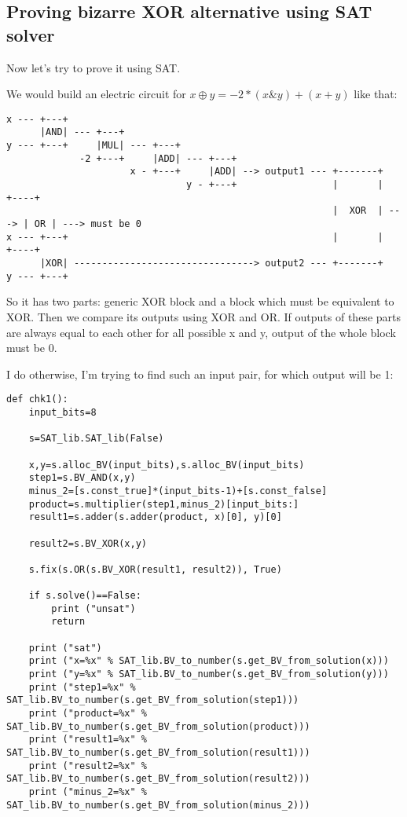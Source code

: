 \subsection{Proving bizarre XOR alternative using SAT solver}
\label{weird_XOR_SAT}

Now let's try to prove it using SAT.

We would build an electric circuit for $x \oplus y = -2*(x \& y) + (x + y)$ like that:

\begin{lstlisting}
x --- +---+
      |AND| --- +---+     
y --- +---+     |MUL| --- +---+
             -2 +---+     |ADD| --- +---+
                      x - +---+     |ADD| --> output1 --- +-------+
                                y - +---+                 |       |      +----+
                                                          |  XOR  | ---> | OR | ---> must be 0
x --- +---+                                               |       |      +----+
      |XOR| --------------------------------> output2 --- +-------+
y --- +---+
\end{lstlisting}

So it has two parts: generic XOR block and a block which must be equivalent to XOR.
Then we compare its outputs using XOR and OR.
If outputs of these parts are always equal to each other for all possible x and y, output of the whole block must be 0.

I do otherwise, I'm trying to find such an input pair, for which output will be 1:

\begin{lstlisting}
def chk1():
    input_bits=8

    s=SAT_lib.SAT_lib(False)

    x,y=s.alloc_BV(input_bits),s.alloc_BV(input_bits)
    step1=s.BV_AND(x,y)
    minus_2=[s.const_true]*(input_bits-1)+[s.const_false]
    product=s.multiplier(step1,minus_2)[input_bits:]
    result1=s.adder(s.adder(product, x)[0], y)[0]

    result2=s.BV_XOR(x,y)

    s.fix(s.OR(s.BV_XOR(result1, result2)), True)

    if s.solve()==False:
        print ("unsat")
        return

    print ("sat")
    print ("x=%x" % SAT_lib.BV_to_number(s.get_BV_from_solution(x)))
    print ("y=%x" % SAT_lib.BV_to_number(s.get_BV_from_solution(y)))
    print ("step1=%x" % SAT_lib.BV_to_number(s.get_BV_from_solution(step1)))
    print ("product=%x" % SAT_lib.BV_to_number(s.get_BV_from_solution(product)))
    print ("result1=%x" % SAT_lib.BV_to_number(s.get_BV_from_solution(result1)))
    print ("result2=%x" % SAT_lib.BV_to_number(s.get_BV_from_solution(result2)))
    print ("minus_2=%x" % SAT_lib.BV_to_number(s.get_BV_from_solution(minus_2)))
\end{lstlisting}

